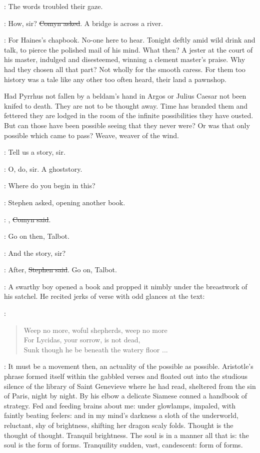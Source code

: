 :
The words troubled their gaze.

\comyn:
How, sir?
\sout{Comyn asked}.
A bridge is across a river.

\StephenInt:
For Haines's chapbook.
No-one here to hear.
Tonight deftly amid wild drink and talk,
to pierce the polished mail of his mind.
What then?
A jester at the court of his master, 
indulged and disesteemed,
winning a clement master's praise.
Why had they chosen all that part?
Not wholly for the smooth caress.
For them too history was a tale like any other too often heard,
their land a pawnshop.

Had Pyrrhus not fallen by a beldam's hand in Argos
or Julius Caesar not been knifed to death.
They are not to be thought away.
Time has branded them
and fettered they are lodged in the room of the infinite possibilities
they have ousted.
But can those have been possible
seeing that they never were?
Or was that only possible which came to pass?
Weave, weaver of the wind.

\All:
Tell us a story, sir.

\All:
O, do, sir. A ghoststory.

\Stephen:
Where do you begin in this?

:
Stephen asked, opening another book.

\comyn:
, \sout{Comyn said}.

\Stephen:
Go on then, Talbot.

\talbot:
And the story, sir?

\Stephen:
After, \sout{Stephen said}.
Go on, Talbot.

:
A swarthy boy opened a book
and propped it nimbly under the breastwork of his satchel.
He recited jerks of verse with odd glances at the text:

\talbot:
\begin{verse}
    Weep no more, woful shepherds, weep no more \\
    For Lycidas, your sorrow, is not dead, \\
    Sunk though he be beneath the watery floor ...
\end{verse}

:
It must be a movement then, an actuality of the possible as possible.
Aristotle's phrase formed itself within the gabbled verses
and floated out into the studious silence of the library of Saint Genevieve
where he had read,
sheltered from the sin of Paris,
night by night.
By his elbow a delicate Siamese conned a handbook of strategy.
Fed and feeding brains about me:
under glowlamps, impaled, with faintly beating feelers:
and in my mind's darkness a sloth of the underworld,
reluctant, shy of brightness, shifting her dragon scaly folds.
Thought is the thought of thought.
Tranquil brightness.
The soul is in a manner all that is:
the soul is the form of forms.
Tranquility sudden, vast, candescent: form of forms.

